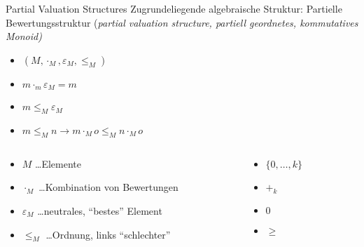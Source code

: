 \begin{frame}{Partial Valuation Structures}
Zugrundeliegende \alert{algebraische Struktur}: Partielle Bewertungsstruktur (\emph{partial valuation structure, partiell geordnetes, kommutatives Monoid)}
\begin{itemize}
\item $(M, \cdot_M, \varepsilon_M, \leq_M)$ 
\item $m \cdot_m \varepsilon_M = m$
\item $m \leq_M \varepsilon_M$
\item $m \leq_M n \rightarrow m \cdot_M o \leq_M n \cdot_M o$
\end{itemize}
\vspace*{2ex}

\begin{columns}[onlytextwidth,T]
    
    \begin{column}{.7\textwidth}
          
    
    \begin{itemize}
    \item $M$ \ldots Elemente
    \item $\cdot_M$ \ldots Kombination von Bewertungen
    \item $\varepsilon_M$ \ldots neutrales, ``bestes'' Element
    \item $\leq_M$ \ldots Ordnung, links ``schlechter''
    \end{itemize}
    \end{column}
    
    \begin{column}{.3\textwidth}
  	 \begin{itemize}
    \item $\{0, \ldots, k \}$ 
    \item $+_k$
    \item $0$ 
    \item $\geq$
    \end{itemize}
    \end{column}
  \end{columns}

  \vspace*{2ex}
  
  \hfill \emph{\cite{Gadducci2013,SchiendorferPvs2015}}
\end{frame}


